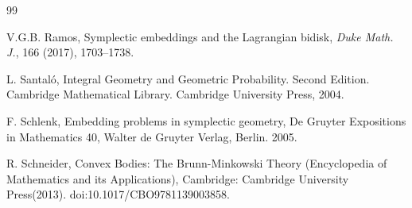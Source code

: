 \documentclass[12pt]{amsart}
\theoremstyle{definition}
\begin{document}
\begin{thebibliography} {99}







 V.G.B. Ramos, Symplectic embeddings and the Lagrangian bidisk, {\em Duke Math. J.}, 166 (2017), 1703--1738.





 L. Santal\'o, Integral Geometry and Geometric Probability. Second Edition. Cambridge Mathematical Library. Cambridge University Press, 2004.

 F. Schlenk, Embedding problems in symplectic geometry,
De Gruyter Expositions in Mathematics 40, Walter de Gruyter Verlag, Berlin. 2005.

 R. Schneider,  Convex Bodies: The Brunn-Minkowski Theory (Encyclopedia of Mathematics and its Applications), Cambridge: Cambridge University Press(2013). doi:10.1017/CBO9781139003858.






\end{thebibliography}
\end{document}
